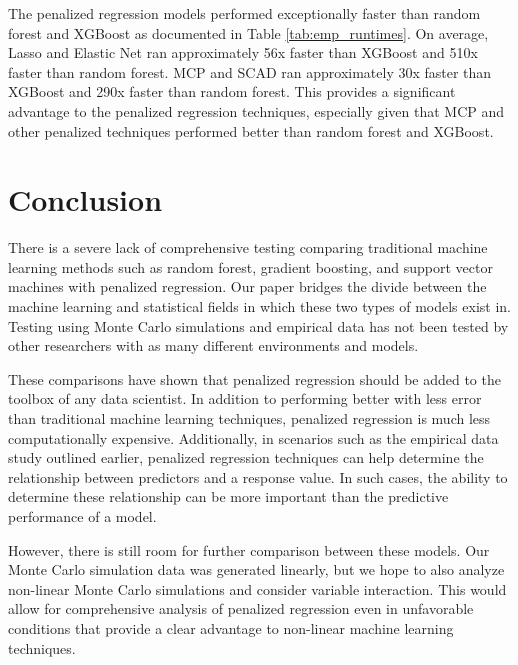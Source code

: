 \documentclass{article}
\begin{document}
	The penalized regression models performed exceptionally faster than random forest and XGBoost as documented in Table \ref{tab:emp_runtimes}. On average, Lasso and Elastic Net ran approximately 56x faster than XGBoost and 510x faster than random forest. MCP and SCAD ran approximately 30x faster than XGBoost and 290x faster than random forest. This provides a significant advantage to the penalized regression techniques, especially given that MCP and other penalized techniques performed better than random forest and XGBoost. 
	
	
	\section{Conclusion}\label{sec:conclusion}
	
	There is a severe lack of comprehensive testing comparing traditional machine learning methods such as random forest, gradient boosting, and support vector machines with penalized regression. Our paper bridges the divide between the machine learning and statistical fields in which these two types of models exist in. Testing using Monte Carlo simulations and empirical data has not been tested by other researchers with as many different environments and models.
	
	These comparisons have shown that penalized regression should be added to the toolbox of any data scientist. In addition to performing better with less error than traditional machine learning techniques, penalized regression is much less computationally expensive. Additionally, in scenarios such as the empirical data study outlined earlier, penalized regression techniques can help determine the relationship between predictors and a response value. In such cases, the ability to determine these relationship can be more important than the predictive performance of a model.
	
	However, there is still room for further comparison between these models. Our Monte Carlo simulation data was generated linearly, but we hope to also analyze non-linear Monte Carlo simulations and consider variable interaction. This would allow for comprehensive analysis of penalized regression even in unfavorable conditions that provide a clear advantage to non-linear machine learning techniques.
	
\end{document}
